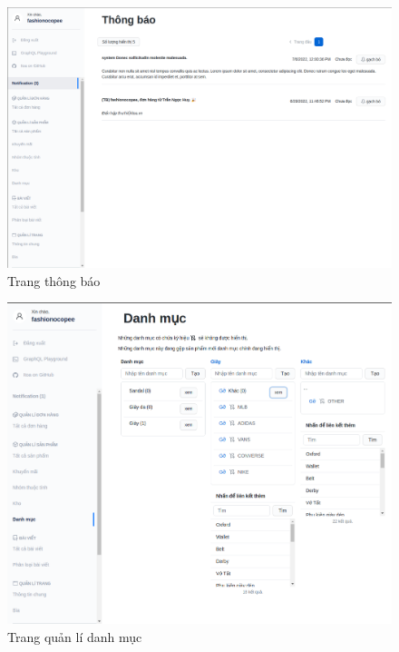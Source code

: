 \begin{figure}[!htbp]
	\begin{center}	
		\includegraphics[width=\textwidth]{./results/notifications}
		\caption{Trang thông báo}
	\end{center}
\end{figure}
\clearpage
\FloatBarrier
\begin{figure}[!htbp]
	\begin{center}	
		\includegraphics[width=\textwidth]{./results/categories}
		\caption{Trang quản lí danh mục}
	\end{center}
\end{figure}
\clearpage
\FloatBarrier

